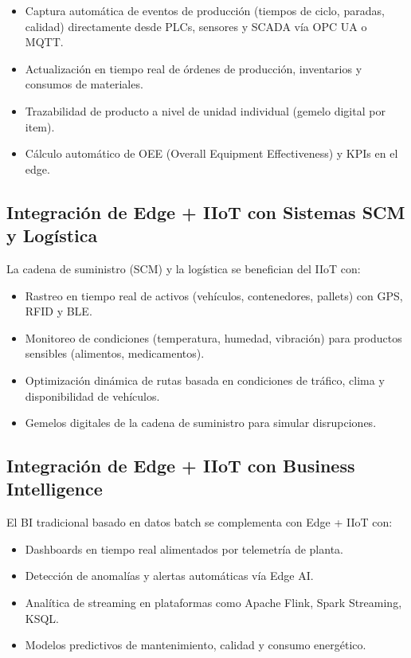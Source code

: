 ﻿\documentclass[12pt,a4paper,oneside]{article}
\begin{document}
\begin{itemize}[leftmargin=*]
    \item Captura automática de eventos de producción (tiempos de ciclo, paradas, calidad) directamente desde PLCs, sensores y SCADA vía OPC UA o MQTT.
    \item Actualización en tiempo real de órdenes de producción, inventarios y consumos de materiales.
    \item Trazabilidad de producto a nivel de unidad individual (gemelo digital por item).
    \item Cálculo automático de OEE (Overall Equipment Effectiveness) y KPIs en el edge.
\end{itemize}

\subsection{Integración de Edge + IIoT con Sistemas SCM y Logística}

La cadena de suministro (SCM) y la logística se benefician del IIoT con:

\begin{itemize}[leftmargin=*]
    \item Rastreo en tiempo real de activos (vehículos, contenedores, pallets) con GPS, RFID y BLE.
    \item Monitoreo de condiciones (temperatura, humedad, vibración) para productos sensibles (alimentos, medicamentos).
    \item Optimización dinámica de rutas basada en condiciones de tráfico, clima y disponibilidad de vehículos.
    \item Gemelos digitales de la cadena de suministro para simular disrupciones.
\end{itemize}

\subsection{Integración de Edge + IIoT con Business Intelligence}

El BI tradicional basado en datos batch se complementa con Edge + IIoT con:

\begin{itemize}[leftmargin=*]
    \item Dashboards en tiempo real alimentados por telemetría de planta.
    \item Detección de anomalías y alertas automáticas vía Edge AI.
    \item Analítica de streaming en plataformas como Apache Flink, Spark Streaming, KSQL.
    \item Modelos predictivos de mantenimiento, calidad y consumo energético.
\end{itemize}
\end{document}
